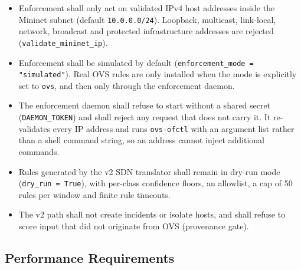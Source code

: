 \documentclass[12pt,a4paper]{report}
\begin{document}
\begin{itemize}
    \item {Enforcement shall only act on validated IPv4 host addresses inside the Mininet subnet (default \texttt{10.0.0.0/24}). Loopback, multicast, link-local, network, broadcast and protected infrastructure addresses are rejected (\texttt{validate\_mininet\_ip}).}

    \item {Enforcement shall be simulated by default (\texttt{enforcement\_mode = "simulated"}). Real OVS rules are only installed when the mode is explicitly set to \texttt{ovs}, and then only through the enforcement daemon.}
    \item {The enforcement daemon shall refuse to start without a shared secret (\texttt{DAEMON\_TOKEN}) and shall reject any request that does not carry it. It re-validates every IP address and runs \texttt{ovs-ofctl} with an argument list rather than a shell command string, so an address cannot inject additional commands.}

    \item {Rules generated by the v2 SDN translator shall remain in dry-run mode (\texttt{dry\_run = True}), with per-class confidence floors, an allowlist, a cap of 50 rules per window and finite rule timeouts.}

    \item {The v2 path shall not create incidents or isolate hosts, and shall refuse to score input that did not originate from OVS (provenance gate).}
\end{itemize}

\subsection{Performance Requirements}
\end{document}
